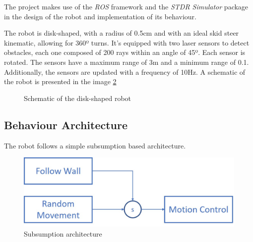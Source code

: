 \documentclass[10pt,journal,compsoc]{IEEEtran}
\begin{document}
The project makes use of the \textit{ROS} framework and the \textit{STDR Simulator} package in the design of the robot and implementation of its behaviour.

The robot is disk-shaped, with a radius of 0.5cm and with an ideal skid steer kinematic, allowing for 360º turns. It’s equipped with two laser sensors to detect obstacles, each one composed of 200 rays within an angle of 45º. Each sensor is rotated. The sensors have a maximum range of 3m and a minimum range of 0.1. Additionally, the sensors are updated with a frequency of 10Hz. A schematic of the robot is presented in the image \ref{fig:robot}


   \begin{figure}[thpb]
      \centering
      \caption{Schematic of the disk-shaped robot}
      \label{fig:robot}
   \end{figure}
   
   
\subsection{Behaviour Architecture}

The robot follows a simple subsumption based architecture.

   \begin{figure}[thpb]
      \centering
      \includegraphics[scale=0.265]{img/architecture.jpg}
      \caption{Subsumption architecture}
      \label{fig:robot}
   \end{figure}
\end{document}
